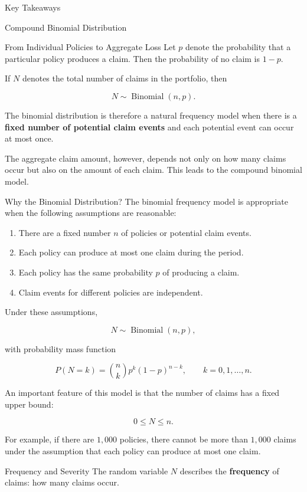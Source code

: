 \documentclass[
  ignorenonframetext,
  aspectratio=169,
]{beamer}
\providecommand{\tightlist}{%
  \setlength{\itemsep}{0pt}\setlength{\parskip}{0pt}}
\begin{document}
\begin{frame}{Key Takeaways}
\begin{block}{Compound Binomial Distribution}
\begin{block}{From Individual Policies to Aggregate Loss}
Let \(p\) denote the probability that a particular policy produces a
claim. Then the probability of no claim is \(1-p\).

If \(N\) denotes the total number of claims in the portfolio, then

\[
N\sim\operatorname{Binomial}(n,p).
\]

The binomial distribution is therefore a natural frequency model when
there is a \textbf{fixed number of potential claim events} and each
potential event can occur at most once.

The aggregate claim amount, however, depends not only on how many claims
occur but also on the amount of each claim. This leads to the compound
binomial model.
\end{block}

\begin{block}{Why the Binomial Distribution?}
\protect{}\label{why-the-binomial-distribution-1}
The binomial frequency model is appropriate when the following
assumptions are reasonable:

\begin{enumerate}
\tightlist
\item
  There are a fixed number \(n\) of policies or potential claim events.
\item
  Each policy can produce at most one claim during the period.
\item
  Each policy has the same probability \(p\) of producing a claim.
\item
  Claim events for different policies are independent.
\end{enumerate}

Under these assumptions,

\[
N\sim\operatorname{Binomial}(n,p),
\]

with probability mass function

\[
P(N=k)
=
\binom{n}{k}p^k(1-p)^{n-k},
\qquad k=0,1,\ldots,n.
\]

An important feature of this model is that the number of claims has a
fixed upper bound:

\[
0\leq N\leq n.
\]

For example, if there are \(1{,}000\) policies, there cannot be more
than \(1{,}000\) claims under the assumption that each policy can
produce at most one claim.
\end{block}

\begin{block}{Frequency and Severity}
\protect{}\label{frequency-and-severity}
The random variable \(N\) describes the \textbf{frequency} of claims:
how many claims occur.


\end{block}
\end{block}
\end{frame}
\end{document}
